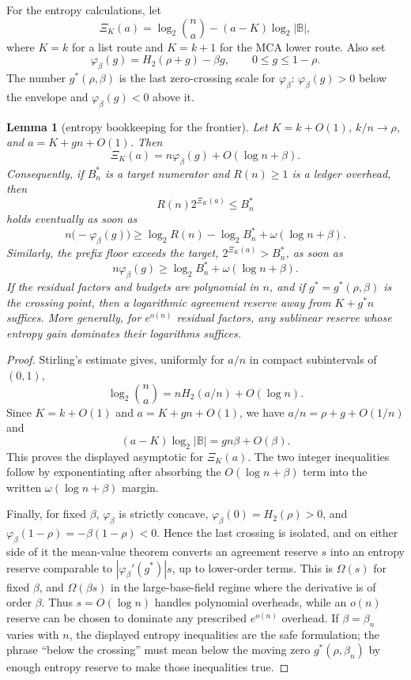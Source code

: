 \documentclass[a4paper,11pt]{amsart}
\newtheorem{lemma}[lemma]{Lemma}
\theoremstyle{remark}
\newcommand{\B}{\mathbb B}
\newcommand{\Htwo}{H_2}
\begin{document}
For the entropy calculations, let
\[
        \Xi_K(a)=\log_2\binom na-(a-K)\log_2|\B|,
\]
where \(K=k\) for a list route and \(K=k+1\) for the MCA lower route.  Also set
\[
        \varphi_\beta(g)=\Htwo(\rho+g)-\beta g,
        \qquad 0\le g\le1-\rho .
\]
The number \(g^*(\rho,\beta)\) is the last zero-crossing scale for \(\varphi_\beta\): \(\varphi_\beta(g)>0\) below the envelope and \(\varphi_\beta(g)<0\) above it.

\begin{lemma}[entropy bookkeeping for the frontier]\label{lem:entropy-bookkeeping}
Let \(K=k+O(1)\), \(k/n\to\rho\), and \(a=K+gn+O(1)\).  Then
\[
        \Xi_K(a)=n\varphi_\beta(g)+O(\log n+\beta).
\]
Consequently, if \(B_n^*\) is a target numerator and \(R(n)\ge1\) is a ledger overhead, then
\[
        R(n)2^{\Xi_K(a)}\le B_n^*
\]
holds eventually as soon as
\[
        n\bigl(-\varphi_\beta(g)\bigr)
        \ge
        \log_2R(n)-\log_2B_n^*+\omega(\log n+\beta).
\]
Similarly, the prefix floor exceeds the target, \(2^{\Xi_K(a)}>B_n^*\), as soon as
\[
        n\varphi_\beta(g)
        \ge
        \log_2B_n^*+\omega(\log n+\beta).
\]
If the residual factors and budgets are polynomial in \(n\), and if \(g^*=g^*(\rho,\beta)\) is the crossing point, then a logarithmic agreement reserve away from \(K+g^*n\) suffices.  More generally, for \(e^{o(n)}\) residual factors, any sublinear reserve whose entropy gain dominates their logarithms suffices.
\end{lemma}

\begin{proof}
Stirling's estimate gives, uniformly for \(a/n\) in compact subintervals of \((0,1)\),
\[
        \log_2\binom na=n\Htwo(a/n)+O(\log n).
\]
Since \(K=k+O(1)\) and \(a=K+gn+O(1)\), we have \(a/n=\rho+g+O(1/n)\) and
\[
        (a-K)\log_2|\B|=gn\beta+O(\beta).
\]
This proves the displayed asymptotic for \(\Xi_K(a)\).  The two integer inequalities follow by exponentiating after absorbing the \(O(\log n+\beta)\) term into the written \(\omega(\log n+\beta)\) margin.

Finally, for fixed \(\beta\), \(\varphi_\beta\) is strictly concave, \(\varphi_\beta(0)=\Htwo(\rho)>0\), and \(\varphi_\beta(1-\rho)=-\beta(1-\rho)<0\).  Hence the last crossing is isolated, and on either side of it the mean-value theorem converts an agreement reserve \(s\) into an entropy reserve comparable to \(|\varphi_\beta'(g^*)|s\), up to lower-order terms.  This is \(\Omega(s)\) for fixed \(\beta\), and \(\Omega(\beta s)\) in the large-base-field regime where the derivative is of order \(\beta\).  Thus \(s=O(\log n)\) handles polynomial overheads, while an \(o(n)\) reserve can be chosen to dominate any prescribed \(e^{o(n)}\) overhead.  If \(\beta=\beta_n\) varies with \(n\), the displayed entropy inequalities are the safe formulation; the phrase ``below the crossing'' must mean below the moving zero \(g^*(\rho,\beta_n)\) by enough entropy reserve to make those inequalities true.
\end{proof}
\end{document}

